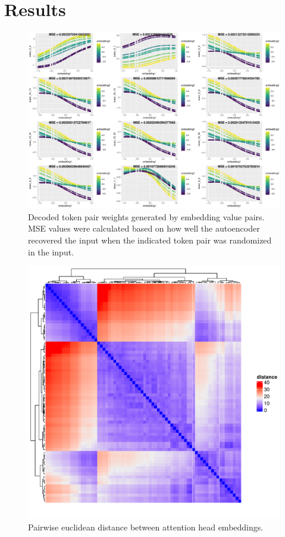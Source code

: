 \documentclass{article}
\begin{document}
\section{Results}

\begin{figure}
	\includegraphics[width=\textwidth]{figs/top.embeddings.pdf}
	\caption{Decoded token pair weights generated by embedding value pairs. MSE values were calculated based on how well the autoencoder recovered the input when the indicated token pair was randomized in the input.}
	\label{}
\end{figure}

\begin{figure}
	\includegraphics[width=\textwidth]{figs/dist.pdf}
	\caption{Pairwise euclidean distance between attention head embeddings.}
	\label{}
\end{figure}
\end{document}
